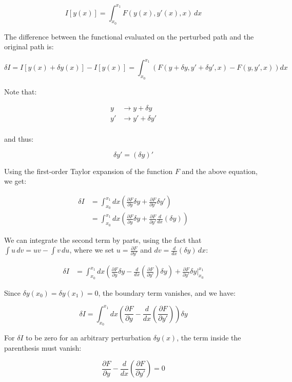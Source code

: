 \[
    I[y(x)] = \int_{x_0}^{x_1} F(y(x), y'(x), x) \, dx
\]

The difference between the functional evaluated on the perturbed path and the original 
path is:

\[
    \delta I = I[y(x) + \delta y(x)] - I[y(x)] = \int_{x_0}^{x_1} \left( F(y + \delta y, y' + \delta y', x) - F(y, y', x) \right) dx
\]

Note that:

\begin{align*}
    y &\rightarrow y + \delta y \\
    y' &\rightarrow y' + \delta y' \\
\end{align*}

and thus:

\[
    \delta y' = (\delta y)'
\]

Using the first-order Taylor expansion of the function $F$ and the above equation, we get:

\begin{align*}
    \delta I &= \int_{x_0}^{x_1} dx \left( \frac{\partial F}{\partial y} \delta y + \frac{\partial F}{\partial y'} \delta y' \right) \\
    &= \int_{x_0}^{x_1} dx \left( \frac{\partial F}{\partial y} \delta y + \frac{\partial F}{\partial y'} \frac{d}{dx}(\delta y) \right)
\end{align*}

We can integrate the second term by parts, using the fact that 
$\int u \, dv = uv - \int v \, du$, where we set $u = \frac{\partial F}{\partial y'}$ 
and $dv = \frac{d}{dx}(\delta y)\, dx$:

\begin{align*}
    \delta I &= \int_{x_0}^{x_1} dx \left( \frac{\partial F}{\partial y} \delta y - \frac{d}{dx} \left(\frac{\partial F}{\partial y'}\right) \delta y \right) + \frac{\partial F}{\partial y'} \delta y \bigg|_{x_0}^{x_1}
\end{align*}

Since $\delta y(x_0) = \delta y(x_1) = 0$, the boundary term vanishes, and we have:

\[
    \delta I = \int_{x_0}^{x_1} dx \left( \frac{\partial F}{\partial y} - \frac{d}{dx} \left(\frac{\partial F}{\partial y'}\right) \right) \delta y
\]

For $\delta I$ to be zero for an arbitrary perturbation $\delta y(x)$, the term inside
the parenthesis must vanish:

\[
    \frac{\partial F}{\partial y} - \frac{d}{dx} \left(\frac{\partial F}{\partial y'}\right) = 0
\]

